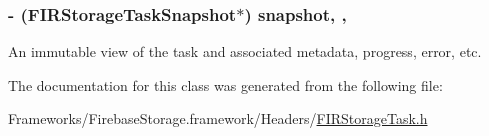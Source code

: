 \subsubsection[{snapshot}]{\setlength{\rightskip}{0pt plus 5cm}-\/ ({\bf F\+I\+R\+Storage\+Task\+Snapshot}$\ast$) snapshot\hspace{0.3cm}{\ttfamily [read]}, {\ttfamily [nonatomic]}, {\ttfamily [strong]}}\label{interface_f_i_r_storage_task_a43e00623001ff84760f98fd4f79eb9ac}
An immutable view of the task and associated metadata, progress, error, etc. 

The documentation for this class was generated from the following file\+:\begin{DoxyCompactItemize}
\item 
Frameworks/\+Firebase\+Storage.\+framework/\+Headers/\hyperlink{_f_i_r_storage_task_8h}{F\+I\+R\+Storage\+Task.\+h}\end{DoxyCompactItemize}

